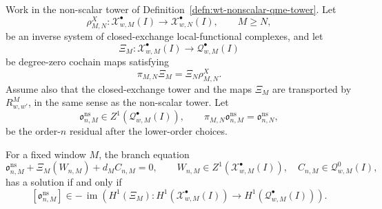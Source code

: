\begin{thm}
\label{thm:wt-closed-exchange-counterterm-criterion}
  Work in the non-scalar tower of
  Definition~\ref{defn:wt-nonscalar-qme-tower}.  Let
  \[
    \rho^X_{M,N}\colon
    \mathcal X^\bullet_{w,M}(I)\longrightarrow
    \mathcal X^\bullet_{w,N}(I),\qquad M\geq N,
  \]
  be an inverse system of closed-exchange local-functional complexes, and
  let
  \[
    \Xi_M\colon
    \mathcal X^\bullet_{w,M}(I)\longrightarrow
    \mathcal Q^\bullet_{w,M}(I)
  \]
  be degree-zero cochain maps satisfying
  \[
    \pi_{M,N}\Xi_M=\Xi_N\rho^X_{M,N}.
  \]
  Assume also that the closed-exchange tower and the maps \(\Xi_M\) are
  transported by \(R^M_{w,w'}\), in the same sense as the non-scalar
  tower.  Let
  \[
    \mathfrak o^{\mathrm{ns}}_{n,M}
      \in Z^1(\mathcal Q^\bullet_{w,M}(I)),\qquad
    \pi_{M,N}\mathfrak o^{\mathrm{ns}}_{n,M}
      =\mathfrak o^{\mathrm{ns}}_{n,N},
  \]
  be the order-\(n\) residual after the lower-order choices.

  For a fixed window \(M\), the branch equation
  \[
    \mathfrak o^{\mathrm{ns}}_{n,M}
      +\Xi_M(W_{n,M})+d_M C_{n,M}=0,
      \qquad
      W_{n,M}\in Z^1(\mathcal X^\bullet_{w,M}(I)),
      \quad C_{n,M}\in\mathcal Q^0_{w,M}(I),
  \]
  has a solution if and only if
  \[
    [\mathfrak o^{\mathrm{ns}}_{n,M}]
      \in
      -\,\operatorname{im}\!\left(
        H^1(\Xi_M)\colon
        H^1(\mathcal X^\bullet_{w,M}(I))
        \to H^1(\mathcal Q^\bullet_{w,M}(I))
      \right).
  \]


\end{thm}
